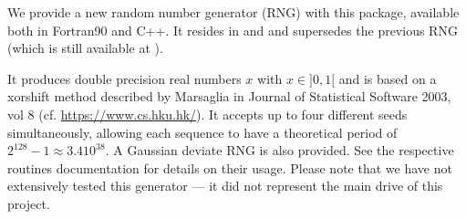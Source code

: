 \documentclass[12pt,twoside]{article}
\begin{document}
We provide a new random number generator (RNG) with this package, available both
in Fortran90 and C++. 
It resides in 
and 
and supersedes the previous RNG (which is still available at 
). 

It produces double precision real numbers $x$ with $x\in]0,1[$ and is based 
on a xorshift method described by Marsaglia in 
Journal of Statistical Software 2003, vol 8
(cf. \url{https://www.cs.hku.hk/}).
It accepts up to four different seeds simultaneously, allowing each sequence to
have a
theoretical period of $2^{128}-1 \approx 3.4 10^{38}$. A Gaussian deviate RNG is
also provided. See the respective routines documentation for details on their usage.
Please note that we have not extensively tested this generator 
--- it did not represent the main drive of this project.



\end{document}
